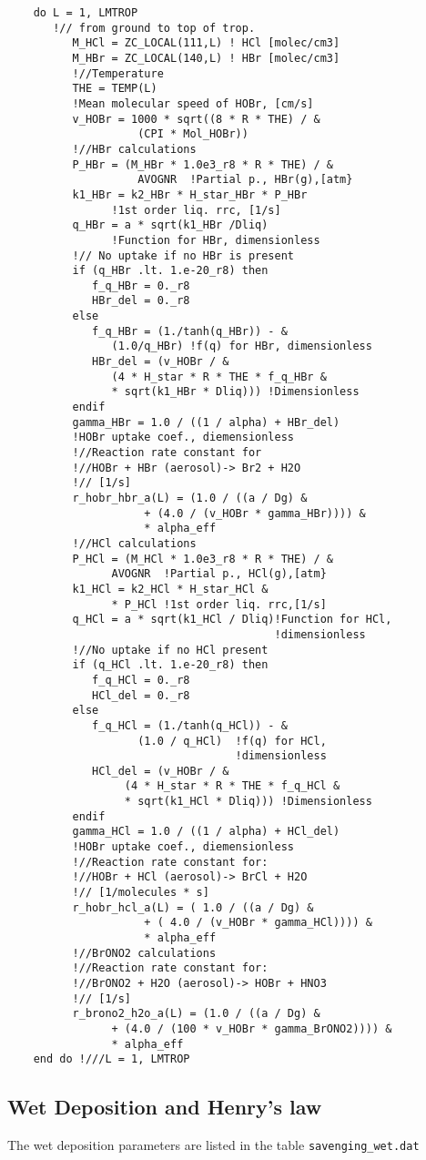 \begin{lstlisting}
    do L = 1, LMTROP
       !// from ground to top of trop.
          M_HCl = ZC_LOCAL(111,L) ! HCl [molec/cm3]
          M_HBr = ZC_LOCAL(140,L) ! HBr [molec/cm3]
          !//Temperature
          THE = TEMP(L)
          !Mean molecular speed of HOBr, [cm/s]
          v_HOBr = 1000 * sqrt((8 * R * THE) / &
                    (CPI * Mol_HOBr))
          !//HBr calculations
          P_HBr = (M_HBr * 1.0e3_r8 * R * THE) / &
                    AVOGNR  !Partial p., HBr(g),[atm}
          k1_HBr = k2_HBr * H_star_HBr * P_HBr 
                !1st order liq. rrc, [1/s]
          q_HBr = a * sqrt(k1_HBr /Dliq)       
                !Function for HBr, dimensionless
          !// No uptake if no HBr is present
          if (q_HBr .lt. 1.e-20_r8) then
             f_q_HBr = 0._r8
             HBr_del = 0._r8
          else
             f_q_HBr = (1./tanh(q_HBr)) - &
                (1.0/q_HBr) !f(q) for HBr, dimensionless
             HBr_del = (v_HOBr / &
                (4 * H_star * R * THE * f_q_HBr &
                * sqrt(k1_HBr * Dliq))) !Dimensionless
          endif
          gamma_HBr = 1.0 / ((1 / alpha) + HBr_del)
          !HOBr uptake coef., diemensionless
          !//Reaction rate constant for 
          !//HOBr + HBr (aerosol)-> Br2 + H2O
          !// [1/s]
          r_hobr_hbr_a(L) = (1.0 / ((a / Dg) &
                     + (4.0 / (v_HOBr * gamma_HBr)))) &
                     * alpha_eff
          !//HCl calculations
          P_HCl = (M_HCl * 1.0e3_r8 * R * THE) / &
                AVOGNR  !Partial p., HCl(g),[atm}
          k1_HCl = k2_HCl * H_star_HCl &
                * P_HCl !1st order liq. rrc,[1/s]
          q_HCl = a * sqrt(k1_HCl / Dliq)!Function for HCl, 
                                         !dimensionless
          !//No uptake if no HCl present
          if (q_HCl .lt. 1.e-20_r8) then
             f_q_HCl = 0._r8
             HCl_del = 0._r8
          else
             f_q_HCl = (1./tanh(q_HCl)) - &
                    (1.0 / q_HCl)  !f(q) for HCl, 
                                   !dimensionless
             HCl_del = (v_HOBr / &
                  (4 * H_star * R * THE * f_q_HCl &
                  * sqrt(k1_HCl * Dliq))) !Dimensionless
          endif
          gamma_HCl = 1.0 / ((1 / alpha) + HCl_del)
          !HOBr uptake coef., diemensionless
          !//Reaction rate constant for: 
          !//HOBr + HCl (aerosol)-> BrCl + H2O
          !// [1/molecules * s]
          r_hobr_hcl_a(L) = ( 1.0 / ((a / Dg) &
                     + ( 4.0 / (v_HOBr * gamma_HCl)))) &
                     * alpha_eff
          !//BrONO2 calculations
          !//Reaction rate constant for: 
          !//BrONO2 + H2O (aerosol)-> HOBr + HNO3
          !// [1/s]
          r_brono2_h2o_a(L) = (1.0 / ((a / Dg) &
                + (4.0 / (100 * v_HOBr * gamma_BrONO2)))) &
                * alpha_eff
    end do !///L = 1, LMTROP

\end{lstlisting}


\subsection{Wet Deposition and Henry's law}\label{sec:henrys_law_ctm3}

The wet deposition parameters are listed in the table \texttt{savenging\_wet.dat} 

%

%